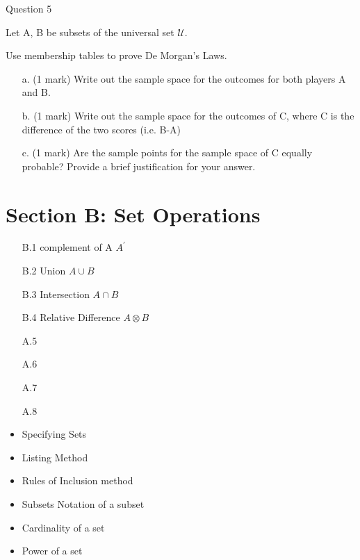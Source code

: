 Question 5


Let A, B be subsets of the universal set $\mathcal{U}$.

Use membership tables to prove De Morgan's Laws.


%
%
%


\begin{itemize}
\item[a.] (1 mark) Write out the sample space for the outcomes for both players A and B.
\item[b.] (1 mark) Write out the sample space for the outcomes of C, where C is the difference of the two scores (i.e. B-A)
\item[c.] (1 mark) Are the sample points for the sample space of C equally probable? Provide a brief justification for your answer.
\end{itemize}

\newpage
\section*{Section B: Set Operations}
\begin{itemize}
\item[B.1] complement of A $A^{\prime}$
\item[B.2] Union $A \cup B$
\item[B.3] Intersection $A \cap B$
\item[B.4] Relative Difference $A \otimes B$
\item[A.5]
\item[A.6]
\item[A.7]
\item[A.8]
\end{itemize}
\newpage


\begin{itemize}
\item Specifying Sets
\item Listing Method
\item Rules of Inclusion method
\end{itemize}


\begin{itemize}
\item Subsets Notation of a subset
\item Cardinality of a set
\item Power of a set
\end{itemize}

